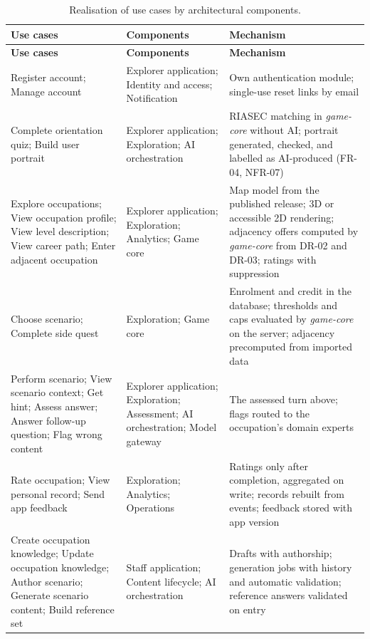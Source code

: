 {\small
\begin{longtable}{|>{\raggedright\arraybackslash}p{}|>{\raggedright\arraybackslash}p{}|>{\raggedright\arraybackslash}p{}|}
\caption{Realisation of use cases by architectural components.} \\
\hline
\textbf{Use cases} & \textbf{Components} & \textbf{Mechanism} \\ \hline
\endfirsthead
\hline
\textbf{Use cases} & \textbf{Components} & \textbf{Mechanism} \\ \hline
\endhead
Register account; Manage account & Explorer application; Identity and access; Notification & Own authentication module; single-use reset links by email \\ \hline
Complete orientation quiz; Build user portrait & Explorer application; Exploration; AI orchestration & RIASEC matching in \textit{game-core} without AI; portrait generated, checked, and labelled as AI-produced (FR-04, NFR-07) \\ \hline
Explore occupations; View occupation profile; View level description; View career path; Enter adjacent occupation & Explorer application; Exploration; Analytics; Game core & Map model from the published release; 3D or accessible 2D rendering; adjacency offers computed by \textit{game-core} from DR-02 and DR-03; ratings with suppression \\ \hline
Choose scenario; Complete side quest & Exploration; Game core & Enrolment and credit in the database; thresholds and caps evaluated by \textit{game-core} on the server; adjacency precomputed from imported data \\ \hline
Perform scenario; View scenario context; Get hint; Assess answer; Answer follow-up question; Flag wrong content & Explorer application; Exploration; Assessment; AI orchestration; Model gateway & The assessed turn above; flags routed to the occupation's domain experts \\ \hline
Rate occupation; View personal record; Send app feedback & Exploration; Analytics; Operations & Ratings only after completion, aggregated on write; records rebuilt from events; feedback stored with app version \\ \hline
Create occupation knowledge; Update occupation knowledge; Author scenario; Generate scenario content; Build reference set & Staff application; Content lifecycle; AI orchestration & Drafts with authorship; generation jobs with history and automatic validation; reference answers validated on entry \\ \hline

\end{longtable}}
